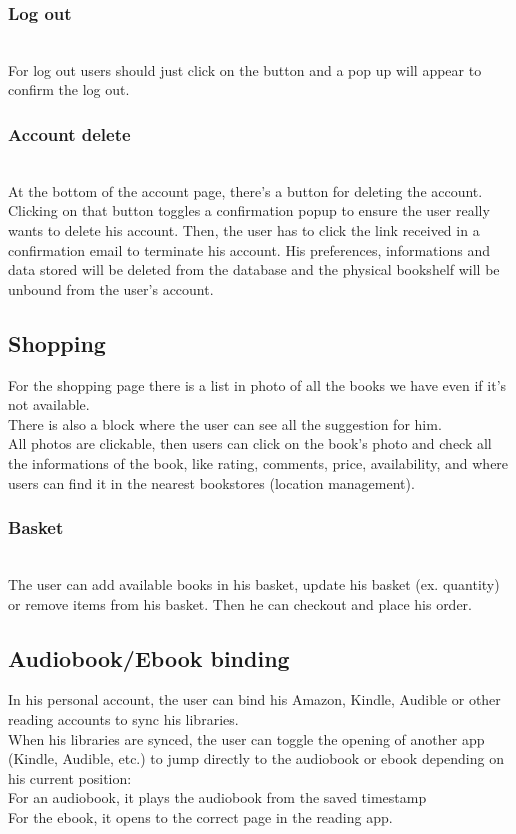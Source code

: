 \documentclass[conference]{IEEEtran}
\begin{document}
\subsubsection{Log out}\hfill\\
For log out users should just click on the button and a pop up will appear to confirm the log out.\\

\subsubsection{Account delete}\hfill\\
At the bottom of the account page, there's a button for deleting the account. Clicking on that button toggles a confirmation popup to ensure the user really wants to delete his account. Then, the user has to click the link received in a confirmation email to terminate his account. His preferences, informations and data stored will be deleted from the database and the physical bookshelf will be unbound from the user's account.\\

\subsection{Shopping}
For the shopping page there is a list in photo of all the books we have even if it’s not available.\\
There is also a block where the user can see all the suggestion for him.\\
All photos are clickable, then users can click on the book’s photo and check all the informations of the book, like rating, comments, price, availability, and where users can find it in the nearest bookstores (location management).\\


\subsubsection{Basket}\hfill\\
The user can add available books in his basket, update his basket (ex. quantity) or remove items from his basket. Then he can checkout and place his order.\\

\subsection{Audiobook/Ebook binding}
In his personal account, the user can bind his Amazon, Kindle, Audible or other reading accounts to sync his libraries.\\
When his libraries are synced, the user can toggle the opening of another app (Kindle, Audible, etc.) to jump directly to the audiobook or ebook depending on his current position:\\
For an audiobook, it plays the audiobook from the saved timestamp\\
For the ebook, it opens to the correct page in the reading app.\\
\end{document}
